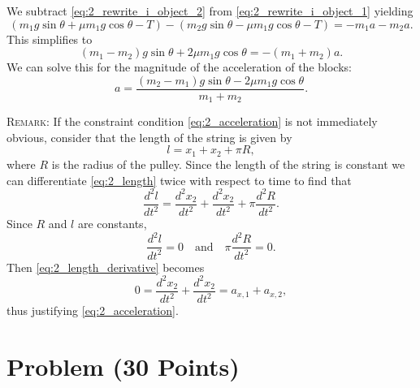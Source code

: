 \documentclass[solutions]{esg8012exam}
\begin{document}
  We subtract \autoref{eq:2_rewrite_i_object_2} from \autoref{eq:2_rewrite_i_object_1} yielding
  \begin{equation}
    (m_1 g \sin\theta + \mu m_1 g \cos\theta - T) - (m_2 g \sin\theta - \mu m_1 g \cos\theta - T) = -m_1 a - m_2 a.
  \end{equation}
  This simplifies to
  \begin{equation}
    (m_1 - m_2) g \sin\theta + 2\mu m_1 g \cos\theta = -(m_1 + m_2) a.
  \end{equation}
  We can solve this for the magnitude of the acceleration of the blocks:
  \begin{equation}
    a = \frac{(m_2 - m_1) g \sin\theta - 2\mu m_1 g \cos\theta}{m_1 + m_2}.
  \end{equation}

  \textsc{Remark}: If the constraint condition \autoref{eq:2_acceleration} is not immediately obvious, consider that the length of the string is given by
  \begin{equation}
    l = x_1 + x_2 + \pi R,\label{eq:2_length}
  \end{equation}
  where $R$ is the radius of the pulley.  Since the length of the string is constant we can differentiate \autoref{eq:2_length} twice with respect to time to find that
  \begin{equation}
    \frac{d^2l}{dt^2} = \frac{d^2x_2}{dt^2} + \frac{d^2x_2}{dt^2} + \pi \frac{d^2R}{dt^2}. \label{eq:2_length_derivative}
  \end{equation}
  Since $R$ and $l$ are constants,
  \begin{equation}
    \frac{d^2l}{dt^2} = 0\quad\text{and}\quad\pi\frac{d^2R}{dt^2} = 0.
  \end{equation}
  Then \autoref{eq:2_length_derivative} becomes
  \begin{equation}
    0 = \frac{d^2x_2}{dt^2} + \frac{d^2x_2}{dt^2} = a_{x, 1} + a_{x, 2},
  \end{equation}
  thus justifying \autoref{eq:2_acceleration}.
\clearpage
\section{Problem \thesection\space(30 Points)}
\end{document}
